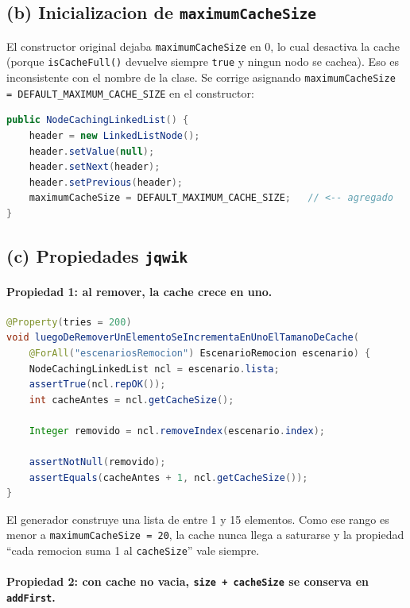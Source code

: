 \documentclass[12pt,a4paper]{article}
\begin{document}
\subsection{(b) Inicializacion de \texttt{maximumCacheSize}}

El constructor original dejaba \texttt{maximumCacheSize} en $0$, lo cual desactiva la cache
(porque \texttt{isCacheFull()} devuelve siempre \texttt{true} y ningun nodo se cachea). Eso es
inconsistente con el nombre de la clase. Se corrige asignando
\texttt{maximumCacheSize = DEFAULT\_MAXIMUM\_CACHE\_SIZE} en el constructor:

\begin{lstlisting}[style=codestyle,language=Java]
public NodeCachingLinkedList() {
    header = new LinkedListNode();
    header.setValue(null);
    header.setNext(header);
    header.setPrevious(header);
    maximumCacheSize = DEFAULT_MAXIMUM_CACHE_SIZE;   // <-- agregado
}
\end{lstlisting}

\subsection{(c) Propiedades \texttt{jqwik}}

\paragraph{Propiedad 1: al remover, la cache crece en uno.}

\begin{lstlisting}[style=codestyle,language=Java]
@Property(tries = 200)
void luegoDeRemoverUnElementoSeIncrementaEnUnoElTamanoDeCache(
    @ForAll("escenariosRemocion") EscenarioRemocion escenario) {
    NodeCachingLinkedList ncl = escenario.lista;
    assertTrue(ncl.repOK());
    int cacheAntes = ncl.getCacheSize();

    Integer removido = ncl.removeIndex(escenario.index);

    assertNotNull(removido);
    assertEquals(cacheAntes + 1, ncl.getCacheSize());
}
\end{lstlisting}

El generador construye una lista de entre 1 y 15 elementos. Como ese rango es menor a
\texttt{maximumCacheSize = 20}, la cache nunca llega a saturarse y la propiedad ``cada
remocion suma 1 al \texttt{cacheSize}'' vale siempre.

\paragraph{Propiedad 2: con cache no vacia, \texttt{size + cacheSize} se conserva en
\texttt{addFirst}.}
\end{document}
